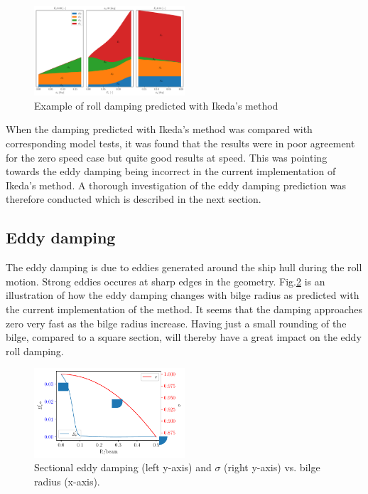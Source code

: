     

    
    \begin{figure}[H]
        \begin{center}\includegraphics[width = 0.5\textwidth]{figures/ikeda_generic.pdf}\end{center}
        \vspace{-1cm}
        \caption{Example of roll damping predicted with Ikeda's method}
        \label{fig:ikeda_generic}
    \end{figure}
    
    When the damping predicted with Ikeda's method was compared with
corresponding model tests, it was found that the results were in poor
agreement for the zero speed case but quite good results at speed. This
was pointing towards the eddy damping being incorrect in the current
implementation of Ikeda's method. A thorough investigation of the eddy
damping prediction was therefore conducted which is described in the
next section.

    \subsection*{Eddy damping}\label{eddy-damping}

The eddy damping is due to eddies generated around the ship hull during
the roll motion. Strong eddies occures at sharp edges in the geometry.
Fig.\ref{fig:eddy_sigma} is an illustration of how the eddy
damping changes with bilge radius as predicted with the current
implementation of the method. It seems that the damping approaches zero
very fast as the bilge radius increase. Having just a small rounding of
the bilge, compared to a square section, will thereby have a great
impact on the eddy roll damping.

    

    \begin{figure}[H]
        \begin{center}\includegraphics[width = 0.5\textwidth]{figures/eddy_sigma.pdf}\end{center}
        \vspace{-1cm}
        \caption{Sectional eddy damping (left y-axis) and $\sigma$ (right y-axis) vs. bilge radius (x-axis).}
        \label{fig:eddy_sigma}
    \end{figure}
    
